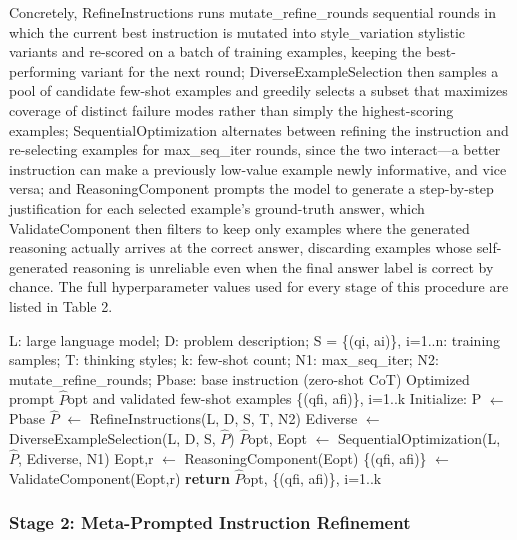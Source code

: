 \documentclass[a4paper,fleqn]{cas-sc}
\begin{document}
Concretely, RefineInstructions runs mutate\_\allowbreak{}refine\_\allowbreak{}rounds sequential rounds in which the current best instruction is mutated into style\_\allowbreak{}variation stylistic variants and re-scored on a batch of training examples, keeping the best-performing variant for the next round; DiverseExampleSelection then samples a pool of candidate few-shot examples and greedily selects a subset that maximizes coverage of distinct failure modes rather than simply the highest-scoring examples; SequentialOptimization alternates between refining the instruction and re-selecting examples for max\_\allowbreak{}seq\_\allowbreak{}iter rounds, since the two interact---a better instruction can make a previously low-value example newly informative, and vice versa; and ReasoningComponent prompts the model to generate a step-by-step justification for each selected example's ground-truth answer, which ValidateComponent then filters to keep only examples where the generated reasoning actually arrives at the correct answer, discarding examples whose self-generated reasoning is unreliable even when the final answer label is correct by chance. The full hyperparameter values used for every stage of this procedure are listed in Table 2.

\begin{algorithm}[htbp]
\caption{PromptWizard Algorithm (adapted from ‹23›)}
\begin{algorithmic}[1]
\Require L: large language model; D: problem description; S = \{(qi, ai)\}, i=1..n: training samples; T: thinking styles; k: few-shot count; N1: max\_\allowbreak{}seq\_\allowbreak{}iter; N2: mutate\_\allowbreak{}refine\_\allowbreak{}rounds; Pbase: base instruction (zero-shot CoT)
\Ensure Optimized prompt $\hat{P}$opt and validated few-shot examples \{(qfi, afi)\}, i=1..k
\State Initialize: P $\leftarrow$ Pbase
\State $\hat{P}$ $\leftarrow$ RefineInstructions(L, D, S, T, N2)
\State Ediverse $\leftarrow$ DiverseExampleSelection(L, D, S, $\hat{P}$)
\State $\hat{P}$opt, Eopt $\leftarrow$ SequentialOptimization(L, $\hat{P}$, Ediverse, N1)
\State Eopt,r $\leftarrow$ ReasoningComponent(Eopt) 
\State \{(qfi, afi)\} $\leftarrow$ ValidateComponent(Eopt,r) 
\State \textbf{return} $\hat{P}$opt, \{(qfi, afi)\}, i=1..k
\end{algorithmic}
\end{algorithm}

\subsubsection{Stage 2: Meta-Prompted Instruction Refinement}
\end{document}
